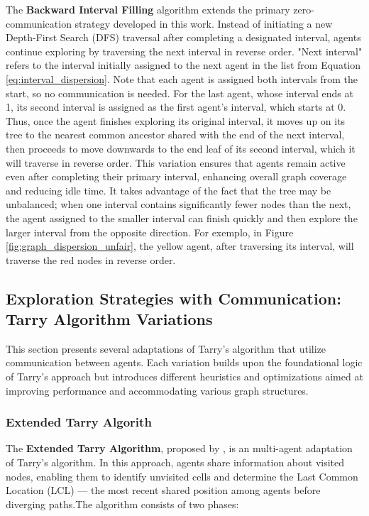 The \textbf{Backward Interval Filling} algorithm extends the primary zero-communication strategy developed in this work. Instead of initiating a new Depth-First Search (DFS) traversal after completing a designated interval, agents continue exploring by traversing the next interval in reverse order. "Next interval" refers to the interval initially assigned to the next agent in the list from Equation \ref{eq:interval_dispersion}. Note that each agent is assigned both intervals from the start, so no communication is needed. For the last agent, whose interval ends at 1, its second interval is assigned as the first agent's interval, which starts at 0. Thus, once the agent finishes exploring its original interval, it moves up on its tree to the nearest common ancestor shared with the end of the next interval, then proceeds to move downwards to the end leaf of its second interval, which it will traverse in reverse order. This variation ensures that agents remain active even after completing their primary interval, enhancing overall graph coverage and reducing idle time. It takes advantage of the fact that the tree may be unbalanced; when one interval contains significantly fewer nodes than the next, the agent assigned to the smaller interval can finish quickly and then explore the larger interval from the opposite direction. For exemplo, in Figure \ref{fig:graph_dispersion_unfair}, the yellow agent, after traversing its interval, will traverse the red nodes in reverse order.

\subsection{Exploration Strategies with Communication: Tarry Algorithm Variations}

\label{section_method_tarry_variations}

This section presents several adaptations of Tarry's algorithm that utilize communication between agents. Each variation builds upon the foundational logic of Tarry's approach but introduces different heuristics and optimizations aimed at improving performance and accommodating various graph structures.

\subsubsection{Extended Tarry Algorith}
\label{section_method_extended_tarry}

The \textbf{Extended Tarry Algorithm}, proposed by , is an multi-agent adaptation of Tarry's algorithm. In this approach, agents share information about visited nodes, enabling them to identify unvisited cells and determine the Last Common Location (LCL) — the most recent shared position among agents before diverging paths.The algorithm consists of two phases:

